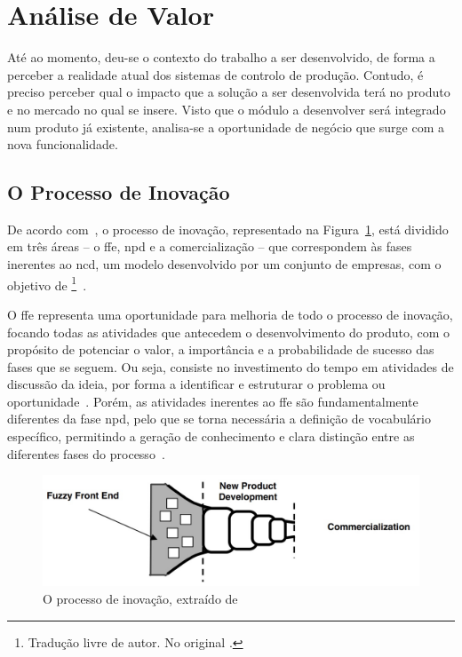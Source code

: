 \section{Análise de Valor}
\label{sec:chap02_valueanalysis}
Até ao momento, deu-se o contexto do trabalho a ser desenvolvido, de forma a perceber a realidade atual dos sistemas de controlo de produção. Contudo, é preciso perceber qual o impacto que a solução a ser desenvolvida terá no produto e no mercado no qual se insere. Visto que o módulo a desenvolver será integrado num produto já existente, analisa-se a oportunidade de negócio que surge com a nova funcionalidade.

\subsection{O Processo de Inovação}
De acordo com~\textcite{ffe_effectivemethods_tools_techniques}, o processo de inovação, representado na Figura~\ref{fig:inovation_process}, está dividido em três áreas -- o \gls{ffe}, \gls{npd} e a comercialização -- que correspondem às fases inerentes ao \gls{ncd}, um modelo desenvolvido por um conjunto de empresas, com o objetivo de \footnote{Tradução livre de autor. No original .}~\parencite{providing_clarity_common_language_ffe}.

O \gls{ffe} representa uma oportunidade para melhoria de todo o processo de inovação, focando todas as atividades que antecedem o desenvolvimento do produto, com o propósito de potenciar o valor, a importância e a probabilidade de sucesso das fases que se seguem. Ou seja, consiste no investimento do tempo em atividades de discussão da ideia, por forma a identificar e estruturar o problema ou oportunidade~\parencite{ffe_effectivemethods_tools_techniques, ffe_theoretical_model}. Porém, as atividades inerentes ao \gls{ffe} são fundamentalmente diferentes da fase \gls{npd}, pelo que se torna necessária a definição de vocabulário específico, permitindo a geração de conhecimento e clara distinção entre as diferentes fases do processo~\parencite{ffe_effectivemethods_tools_techniques}.

\begin{figure}[!ht]
    \centering
    \includegraphics[width=.95\textwidth]{ch02/assets/inovation_process.jpg}
    \caption{O processo de inovação, extraído de~\textcite{ffe_effectivemethods_tools_techniques}}
    \label{fig:inovation_process}
\end{figure}

